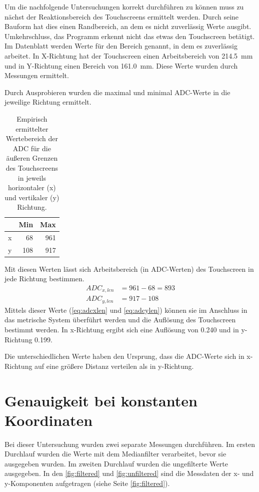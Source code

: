 Um die nachfolgende Untersuchungen korrekt durchführen zu können muss zu nächst der Reaktionsbereich des Touchscreens ermittelt werden.
Durch seine Bauform hat dies einen Randbereich, an dem es nicht zuverlässig Werte ausgibt.
Umkehrschluss, das Programm erkennt nicht das etwas den Touchscreen betätigt.
Im Datenblatt werden Werte für den Bereich genannt, in dem es zuverlässig arbeitet.
In X-Richtung hat der Touchscreen einen Arbeitsbereich von \SI{214,5}{mm} und in Y-Richtung einen Bereich von \SI{161,0}{mm}.
Diese Werte wurden durch Messungen ermittelt.

Durch Ausprobieren wurden die maximal und minimal ADC-Werte in die jeweilige Richtung ermittelt.


\begin{table}[h]
    \centering
    \caption[Empirisch ermittelter Wertebereich der ADC]{Empirisch ermittelter Wertebereich der ADC für die äußeren Grenzen des Touchscreens in jeweils horizontaler (x) und vertikaler (y) Richtung.}
    \begin{tabular}{@{}lrr@{}}
        \toprule
            &Min    &Max\\
        \midrule
        x   &68     &961\\
        y   &108    &917\\
        \bottomrule
    \end{tabular}
    \label{tab:ADC min max}
\end{table}

Mit diesen Werten lässt sich Arbeitsbereich (in ADC-Werten) des Touchscreen in jede Richtung bestimmen.
\begin{align}
    ADC_{x,len} &= 961 - 68 = 893
    \label{eq:adcxlen}\\
    ADC_{y,len} &= 917 - 108
    \label{eq:adcylen}
\end{align}
Mittels dieser Werte (\cref{eq:adcxlen} und \cref{eq:adcylen}) können sie im Anschluss in das metrische System überführt werden und die Auflösung des Touchscreen bestimmt werden.
In x-Richtung ergibt sich eine Auflösung von \SI{0,240}{} und in y-Richtung \SI{0,199}{}.

Die unterschiedlichen Werte haben den Ursprung, dass die ADC-Werte sich in x-Richtung auf eine größere Distanz verteilen als in y-Richtung.

\section{Genauigkeit bei konstanten Koordinaten}
\label{ab:genau}
Bei dieser Untersuchung wurden zwei separate Messungen durchführen.
Im ersten Durchlauf wurden die Werte mit dem Medianfilter verarbeitet, bevor sie ausgegeben wurden.
Im zweiten Durchlauf wurden die ungefilterte Werte ausgegeben.
In den \cref{fig:filtered} und \cref{fig:unfiltered} sind die Messdaten der x- und y-Komponenten aufgetragen (siehe Seite \cref{fig:filtered}).

